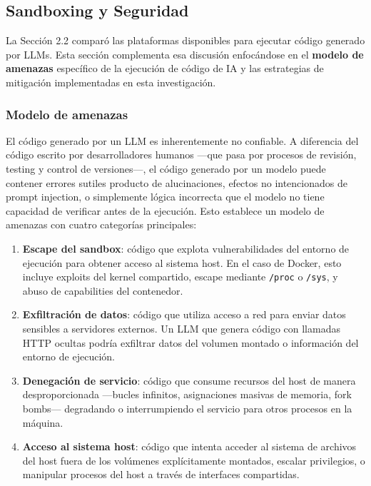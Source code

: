 \subsection{Sandboxing y Seguridad}

La Sección 2.2 comparó las plataformas disponibles para ejecutar código
generado por LLMs. Esta sección complementa esa discusión enfocándose en el
\textbf{modelo de amenazas} específico de la ejecución de código de IA y las
estrategias de mitigación implementadas en esta investigación.

\subsubsection{Modelo de amenazas}

El código generado por un LLM es inherentemente no confiable. A diferencia del
código escrito por desarrolladores humanos ---que pasa por procesos de revisión,
testing y control de versiones---, el código generado por un modelo puede
contener errores sutiles producto de alucinaciones, efectos no intencionados de
prompt injection, o simplemente lógica incorrecta que el modelo no tiene
capacidad de verificar antes de la ejecución. Esto establece un modelo de
amenazas con cuatro categorías principales:

\begin{enumerate}
    \item \textbf{Escape del sandbox}: código que explota vulnerabilidades del
    entorno de ejecución para obtener acceso al sistema host. En el caso de
    Docker, esto incluye exploits del kernel compartido, escape mediante
    \texttt{/proc} o \texttt{/sys}, y abuso de capabilities del contenedor.

    \item \textbf{Exfiltración de datos}: código que utiliza acceso a red para
    enviar datos sensibles a servidores externos. Un LLM que genera código con
    llamadas HTTP ocultas podría exfiltrar datos del volumen montado o
    información del entorno de ejecución.

    \item \textbf{Denegación de servicio}: código que consume recursos del host
    de manera desproporcionada ---bucles infinitos, asignaciones masivas de
    memoria, fork bombs--- degradando o interrumpiendo el servicio para otros
    procesos en la máquina.

    \item \textbf{Acceso al sistema host}: código que intenta acceder al
    sistema de archivos del host fuera de los volúmenes explícitamente montados,
    escalar privilegios, o manipular procesos del host a través de interfaces
    compartidas.
\end{enumerate}

